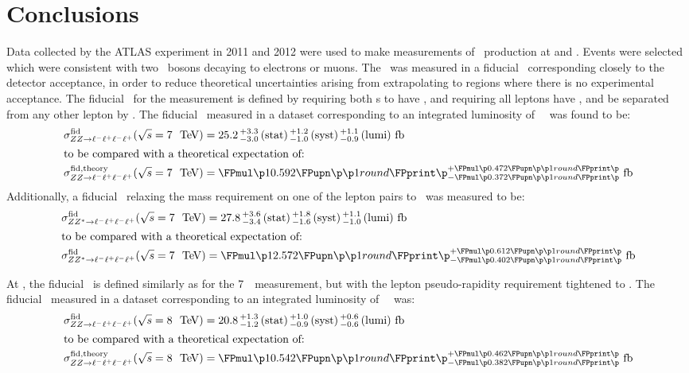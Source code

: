 \graphicspath{{Chapters/Conclusions/Figures/}}
\chapter{Conclusions}
\label{chap:Conclusions}
Data collected by the ATLAS experiment in 2011 and 2012 were used to make
measurements of \ZZ\ production at  and .
Events were selected which were consistent with two \Z\ bosons decaying to
electrons or muons. The \cx\ was measured in a fiducial \phasespace\
corresponding closely to the detector acceptance, in order to reduce theoretical
uncertainties arising from extrapolating to regions where there is no
experimental acceptance.
The fiducial \phasespace\ for the \sqrtseq{7} measurement is defined by
requiring both \leppair s to have \sstooos, and requiring all leptons have ,
\modetalt{3.16} and be separated from any other lepton by \deltaRlt{0.2}. The
fiducial \cx\ measured in a
dataset corresponding to an integrated luminosity of
\LumiPassGRLTwentyEleven~\ifb\ was found to be:
\begin{align}
\sigmaFidZZllll(\sqrtseq{7}) &= \ZZSevenTeVFiducialCrossSectionZZLLLL \\
\intertext{to be compared with a theoretical expectation of:}
\sigmaFidTheoryZZllll(\sqrtseq{7}) &= \ZZSevenTeVTheoryFiducialCrossSectionZZLLLL
\end{align}
Additionally, a fiducial \cx\ relaxing the mass requirement on one of the lepton pairs
to \mllgtt\ was measured to be:
\begin{align}
\sigmaFidZZsllll(\sqrtseq{7}) &= \ZZSevenTeVFiducialCrossSectionZZsLLLL \\
\intertext{to be compared with a theoretical expectation of:}
\sigmaFidZZsllll(\sqrtseq{7}) &= \ZZSevenTeVTheoryFiducialCrossSectionZZsLLLL
\end{align}

At , the fiducial \phasespace\ is defined similarly as for the 7~\tev\
measurement, but with the lepton pseudo-rapidity requirement tightened to
\modetalt{2.7}. The fiducial \cx\ measured in a dataset corresponding to an integrated luminosity of
\LumiPassGRLTwentyTwelve~\ifb\ was:
\begin{align}
\sigmaFidZZllll(\sqrtseq{8}) &= \ZZEightTeVFiducialCrossSectionZZLLLL \\
\intertext{to be compared with a theoretical expectation of:}
\sigmaFidTheoryZZllll(\sqrtseq{8}) &= \ZZEightTeVTheoryFiducialCrossSectionZZLLLL
\end{align}

